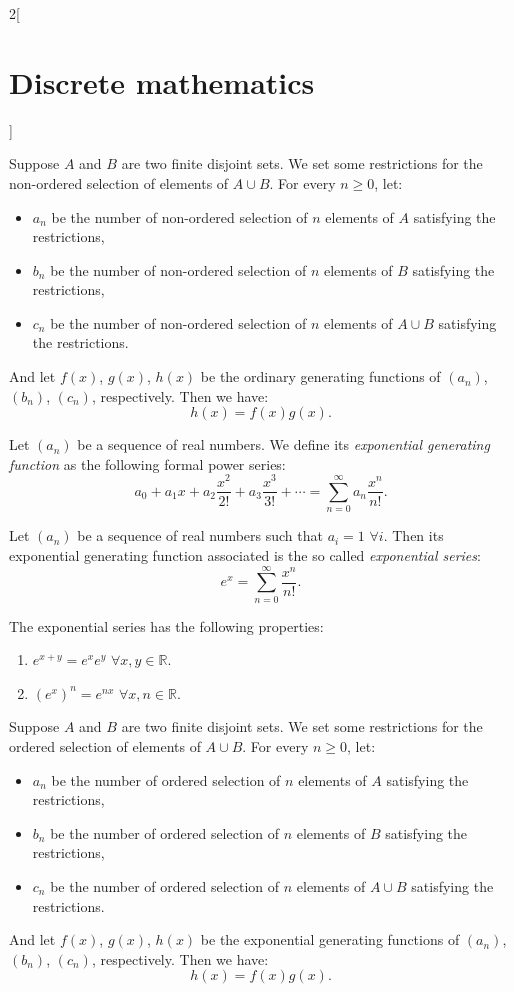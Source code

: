 \documentclass[class=article,10pt,crop=false]{standalone}
\begin{document}
\begin{multicols}{2}[\section{Discrete mathematics}]
\begin{prop}
Suppose $A$ and $B$ are two finite disjoint sets. We set some restrictions for the non-ordered selection of elements of $A\cup B$. For every $n\geq 0$, let:
\begin{itemize}
    \item $a_n$ be the number of non-ordered selection of $n$ elements of $A$ satisfying the restrictions,
    \item $b_n$ be the number of non-ordered selection of $n$ elements of $B$ satisfying the restrictions,
    \item $c_n$ be the number of non-ordered selection of $n$ elements of $A\cup B$ satisfying the restrictions.
\end{itemize}
And let $f(x)$, $g(x)$, $h(x)$ be the ordinary generating functions of $(a_n)$, $(b_n)$, $(c_n)$, respectively. Then we have: $$h(x)=f(x)g(x).$$
\end{prop}
\begin{definition}
Let $(a_n)$ be a sequence of real numbers. We define its \textit{exponential generating function} as the following formal power series: $$a_0+a_1x+a_2\frac{x^2}{2!}+a_3\frac{x^3}{3!}+\cdots=\sum_{n=0}^\infty a_n\frac{x^n}{n!}.$$
\end{definition}
\begin{definition}
Let $(a_n)$ be a sequence of real numbers such that $a_i=1$ $\forall i$. Then its exponential generating function associated is the so called \textit{exponential series}: $$e^x=\sum_{n=0}^\infty \frac{x^n}{n!}.$$
\end{definition}
\begin{prop}
The exponential series has the following properties:
\begin{enumerate}
    \item $e^{x+y}=e^xe^y$ $\forall x,y\in\mathbb{R}$.
    \item $(e^x)^n=e^{nx}$ $\forall x,n\in\mathbb{R}$.
\end{enumerate}
\end{prop}
\begin{prop}
Suppose $A$ and $B$ are two finite disjoint sets. We set some restrictions for the ordered selection of elements of $A\cup B$. For every $n\geq 0$, let:
\begin{itemize}
    \item $a_n$ be the number of ordered selection of $n$ elements of $A$ satisfying the restrictions,
    \item $b_n$ be the number of ordered selection of $n$ elements of $B$ satisfying the restrictions,
    \item $c_n$ be the number of ordered selection of $n$ elements of $A\cup B$ satisfying the restrictions.
\end{itemize}
And let $f(x)$, $g(x)$, $h(x)$ be the exponential generating functions of $(a_n)$, $(b_n)$, $(c_n)$, respectively. Then we have: $$h(x)=f(x)g(x).$$
\end{prop}

\end{multicols}
\end{document}
